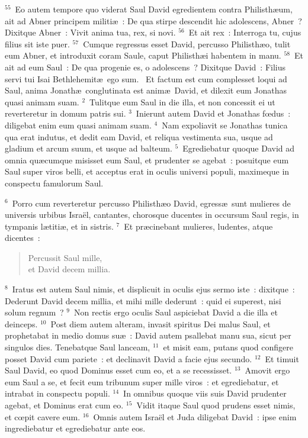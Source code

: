${}^{55}$~Eo autem tempore quo viderat Saul David egredientem contra Philisth\ae um, ait ad Abner principem militi\ae~: De qua stirpe descendit hic adolescens, Abner~? Dixitque Abner~: Vivit anima tua, rex, si novi.
${}^{56}$~Et ait rex~: Interroga tu, cujus filius sit iste puer.
${}^{57}$~Cumque regressus esset David, percusso Philisth\ae o, tulit eum Abner, et introduxit coram Saule, caput Philisth\ae i habentem in manu.
${}^{58}$~Et ait ad eum Saul~: De qua progenie es, o adolescens~? Dixitque David~: Filius servi tui Isai Bethlehemit\ae\ ego sum.
~\lettrine[lines=10,image=true,loversize=0.05,lraise=-0.03]{E}{}t factum est cum complesset loqui ad Saul, anima Jonath\ae\ conglutinata est anim\ae\ David, et dilexit eum Jonathas quasi animam suam.
${}^{2}$~Tulitque eum Saul in die illa, et non concessit ei ut reverteretur in domum patris sui.
${}^{3}$~Inierunt autem David et Jonathas fœdus~: diligebat enim eum quasi animam suam.
${}^{4}$~Nam expoliavit se Jonathas tunica qua erat indutus, et dedit eam David, et reliqua vestimenta sua, usque ad gladium et arcum suum, et usque ad balteum.
${}^{5}$~Egrediebatur quoque David ad omnia qu\ae cumque misisset eum Saul, et prudenter se agebat~: posuitque eum Saul super viros belli, et acceptus erat in oculis universi populi, maximeque in conspectu famulorum Saul.


${}^{6}$~Porro cum reverteretur percusso Philisth\ae o David, egress\ae\ sunt mulieres de universis urbibus Isra\"el, cantantes, chorosque ducentes in occursum Saul regis, in tympanis l\ae titi\ae , et in sistris.
${}^{7}$~Et pr\ae cinebant mulieres, ludentes, atque dicentes~: \begin{flushleft}\begin{verse}Percussit Saul mille,\\ et David decem millia.\end{verse}\end{flushleft}


${}^{8}$~Iratus est autem Saul nimis, et displicuit in oculis ejus sermo iste~: dixitque~: Dederunt David decem millia, et mihi mille dederunt~: quid ei superest, nisi solum regnum~?
${}^{9}$~Non rectis ergo oculis Saul aspiciebat David a die illa et deinceps.
${}^{10}$~Post diem autem alteram, invasit spiritus Dei malus Saul, et prophetabat in medio domus su\ae~: David autem psallebat manu sua, sicut per singulos dies. Tenebatque Saul lanceam,
${}^{11}$~et misit eam, putans quod configere posset David cum pariete~: et declinavit David a facie ejus secundo.
${}^{12}$~Et timuit Saul David, eo quod Dominus esset cum eo, et a se recessisset.
${}^{13}$~Amovit ergo eum Saul a se, et fecit eum tribunum super mille viros~: et egrediebatur, et intrabat in conspectu populi.
${}^{14}$~In omnibus quoque viis suis David prudenter agebat, et Dominus erat cum eo.
${}^{15}$~Vidit itaque Saul quod prudens esset nimis, et cœpit cavere eum.
${}^{16}$~Omnis autem Isra\"el et Juda diligebat David~: ipse enim ingrediebatur et egrediebatur ante eos.


